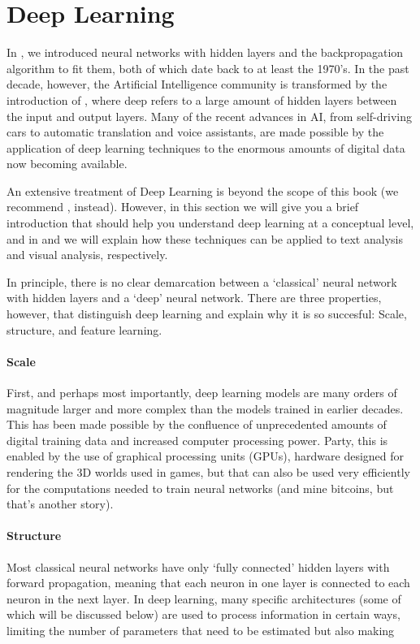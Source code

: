 \section{Deep Learning}
\label{sec:deeplearning}

In , we introduced neural networks with hidden layers and the backpropagation algorithm to fit them,
both of which date back to at least the 1970's.
In the past decade, however, the Artificial Intelligence community is transformed by the introduction of ,
where deep refers to a large amount of hidden layers between the input and output layers.
Many of the recent advances in AI, from self-driving cars to automatic translation and voice assistants,
are made possible by the application of deep learning techniques to the enormous amounts of digital data now becoming available. 

An extensive treatment of Deep Learning is beyond the scope of this book (we recommend \cite{geron2019hands}, instead).
However, in this section we will give you a brief introduction that should help you understand deep learning at a conceptual level,
and in  and  we will explain how these techniques can be applied to text analysis and visual analysis, respectively. 

In principle, there is no clear demarcation between a `classical' neural network with hidden layers and a `deep' neural network.
There are three properties, however, that distinguish deep learning and explain why it is so succesful: Scale, structure, and feature learning.

\paragraph{Scale} First, and perhaps most importantly, deep learning models are many orders of magnitude larger and more complex than the models
trained in earlier decades.
This has been made possible by the confluence of unprecedented amounts of digital training data and increased computer processing power.
Party, this is enabled by the use of graphical processing units (GPUs), hardware designed for rendering the 3D worlds used in games,
but that can also be used very efficiently for the computations needed to train neural networks (and mine bitcoins, but that's another story).

\paragraph{Structure} Most classical neural networks have only `fully connected' hidden layers with forward propagation,
meaning that each neuron in one layer is connected to each neuron in the next layer.
In deep learning, many specific architectures (some of which will be discussed below) are used to process information in certain ways,
limiting the number of parameters that need to be estimated but also making

